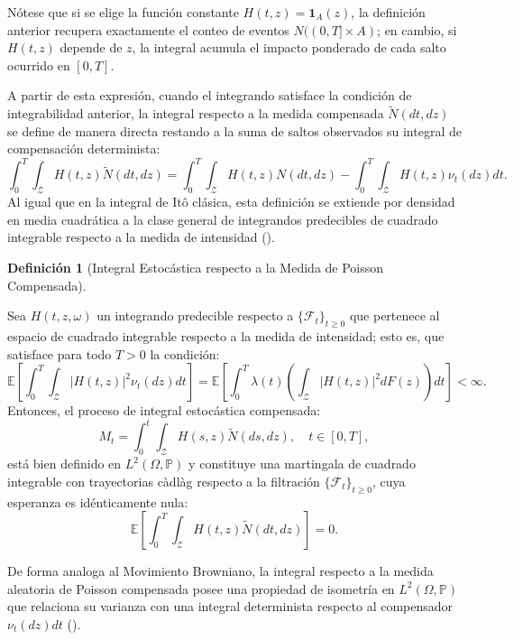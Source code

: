 \documentclass[
  spanish,
  letterpaper,
  DIV=11,
  numbers=noendperiod]{scrreprt}
\theoremstyle{plain}
\theoremstyle{plain}
\theoremstyle{plain}
\theoremstyle{definition}
\newtheorem{definition}{Definición}[chapter]
\theoremstyle{remark}
\begin{document}
Nótese que si se elige la función constante
\(H(t, z) = \mathbf{1}_A(z)\), la definición anterior recupera
exactamente el conteo de eventos \(N((0, T] \times A)\); en cambio, si
\(H(t, z)\) depende de \(z\), la integral acumula el impacto ponderado
de cada salto ocurrido en \([0, T]\).

A partir de esta expresión, cuando el integrando satisface la condición
de integrabilidad anterior, la integral respecto a la medida compensada
\(\tilde{N}(dt, dz)\) se define de manera directa restando a la suma de
saltos observados su integral de compensación determinista: \[
\int_0^T \int_{\mathcal{Z}} H(t, z) \tilde{N}(dt, dz) = \int_0^T \int_{\mathcal{Z}} H(t, z) N(dt, dz) - \int_0^T \int_{\mathcal{Z}} H(t, z) \nu_t(dz) dt.
\] Al igual que en la integral de Itô clásica, esta definición se
extiende por densidad en media cuadrática a la clase general de
integrandos predecibles de cuadrado integrable respecto a la medida de
intensidad ().

\begin{definition}[Integral Estocástica respecto a la Medida de Poisson
Compensada]\protect\hypertarget{def-integral-saltos}{}\label{def-integral-saltos}

Sea \(H(t, z, \omega)\) un integrando predecible respecto a
\(\{\mathcal{F}_t\}_{t \ge 0}\) que pertenece al espacio de cuadrado
integrable respecto a la medida de intensidad; esto es, que satisface
para todo \(T > 0\) la condición: \[
\mathbb{E} \left[ \int_0^T \int_{\mathcal{Z}} \vert H(t, z) \vert^2 \nu_t(dz) dt \right] = \mathbb{E} \left[ \int_0^T \lambda(t) \left( \int_{\mathcal{Z}} \vert H(t, z) \vert^2 dF(z) \right) dt \right] < \infty.
\] Entonces, el proceso de integral estocástica compensada: \[
M_t = \int_0^t \int_{\mathcal{Z}} H(s, z) \tilde{N}(ds, dz), \quad t \in [0, T],
\] está bien definido en \(L^2(\Omega, \mathbb{P})\) y constituye una
martingala de cuadrado integrable con trayectorias càdlàg respecto a la
filtración \(\{\mathcal{F}_t\}_{t \ge 0}\), cuya esperanza es
idénticamente nula: \[
\mathbb{E}\left[ \int_0^T \int_{\mathcal{Z}} H(t, z) \tilde{N}(dt, dz) \right] = 0.
\]

\end{definition}

De forma analoga al Movimiento Browniano, la integral respecto a la
medida aleatoria de Poisson compensada posee una propiedad de isometría
en \(L^2(\Omega, \mathbb{P})\) que relaciona su varianza con una
integral determinista respecto al compensador \(\nu_t(dz)dt\)
().
\end{document}
